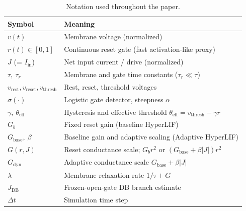 \begin{table}[t]
\centering
\caption{Notation used throughout the paper.}
\label{tab:notation}
\begin{tabular}{l p{}}
\toprule
Symbol & Meaning \\
\midrule
$v(t)$ & Membrane voltage (normalized) \\
$r(t)\in[0,1]$ & Continuous reset gate (fast activation-like proxy) \\
$J$ (= $I_{\mathrm{in}}$) & Net input current / drive (normalized) \\
$\tau,\ \tau_r$ & Membrane and gate time constants ($\tau_r\ll\tau$) \\
$v_{\mathrm{rest}},v_{\mathrm{reset}},v_{\mathrm{thresh}}$ & Rest, reset, threshold voltages \\
$\sigma(\cdot)$ & Logistic gate detector, steepness $\alpha$ \\
$\gamma,\ \theta_{\mathrm{eff}}$ & Hysteresis and effective threshold $\theta_{\mathrm{eff}}=v_{\mathrm{thresh}}-\gamma r$ \\
$G_b$ & Fixed reset gain (baseline HyperLIF) \\
$G_{\mathrm{base}},\ \beta$ & Baseline gain and adaptive scaling (Adaptive HyperLIF) \\
$G(r,J)$ & Reset conductance scale; $G_b r^2$ or $(G_{\mathrm{base}}+\beta|J|)r^2$ \\
$G_{\mathrm{dyn}}$ & Adaptive conductance scale $G_{\mathrm{base}}+\beta|J|$ \\
$\lambda$ & Membrane relaxation rate $1/\tau + G$ \\
$J_{\mathrm{DB}}$ & Frozen-open-gate DB branch estimate \\
$\Delta t$ & Simulation time step \\
\bottomrule
\end{tabular}
\end{table}
